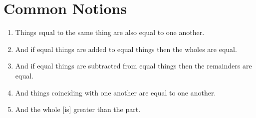 \chapter{Common Notions}

\begin{enumerate}
    \item \label{cn:1} Things equal to the same thing are also equal to one another.
    \item \label{cn:2} And if equal things are added to equal things then the wholes are equal.
    \item \label{cn:3} And if equal things are subtracted from equal things then the remainders are equal.
    \item \label{cn:4} And things coinciding with one another are equal to one another.
    \item \label{cn:5} And the whole [is] greater than the part.
\end{enumerate}

